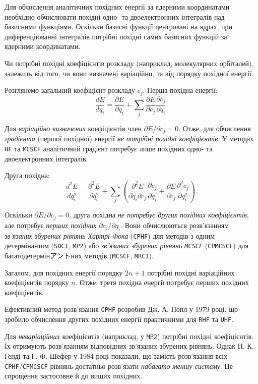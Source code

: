 \documentclass{PySCFBook}
\begin{document}
Для обчислення аналітичних похідних енергії за ядерними координатами необхідно обчислювати похідні одно- та двоелектронних інтегралів над базисними функціями. Оскільки базисні функції центровані на ядрах, при диференціюванні інтегралів потрібні похідні самих базисних функцій за ядерними координатами.

Чи потрібні похідні коефіцієнтів розкладу (наприклад, молекулярних орбіталей), залежить від того, чи вони визначені варіаційно, та від порядку похідної енергії.

Розглянемо загальний коефіцієнт розкладу $c_j$. Перша похідна енергії:
\begin{equation*}
\frac{dE}{dq_i}
= \frac{\partial E}{\partial q_i}
+ \sum_j \frac{\partial E}{\partial c_j} \frac{\partial c_j}{\partial q_i}.
\end{equation*}

Для \emph{варіаційно визначених} коефіцієнтів член $\partial E / \partial c_j = 0$. Отже, для обчислення \emph{градієнта} (першої похідної) енергії \emph{не потрібні похідні коефіцієнтів}. У методах \texttt{HF} та \texttt{MCSCF} аналітичний градієнт потребує лише похідних одно- та двоелектронних інтегралів.

Друга похідна:
\begin{equation*}
\frac{d^2E}{dq_i^2}
= \frac{\partial^2 E}{\partial q_i^2}
+ \sum_j \left(
  \frac{\partial^2 E}{\partial q_i \partial c_j} \frac{\partial c_j}{\partial q_i}
  + \frac{\partial E}{\partial c_j} \frac{\partial^2 c_j}{\partial q_i^2}
\right).
\end{equation*}

Оскільки $\partial E / \partial c_j = 0$, друга похідна \emph{не потребує других похідних коефіцієнтів}, але потребує \emph{перших похідних} $\partial c_j / \partial q_i$. Вони обчислюються розв’язанням \emph{зв’язаних збурених рівнянь Хартрі-Фока} (\texttt{CPHF}) для методів з одним детермінантом (\texttt{SDCI}, \texttt{MP2}) або \emph{зв’язаних збурених рівнянь \texttt{MCSCF}} (\texttt{CPMCSCF}) для багатодетермінアントних методів (\texttt{MCSCF}, \texttt{MRCI}).

Загалом, для похідних енергії порядку $2n+1$ потрібні похідні варіаційних коефіцієнтів порядку $n$. Отже, третя похідна енергії потребує перших похідних коефіцієнтів.

Ефективний метод розв’язання \texttt{CPHF} розробив Дж. А. Попл у 1979 році, що зробило обчислення других похідних енергії практичними для \texttt{RHF} та \texttt{UHF}.

Для \emph{неваріаційних} коефіцієнтів (наприклад, у \texttt{MP2}) потрібні похідні коефіцієнтів. Їх отримують розв’язанням відповідних зв’язаних збурених рівнянь. Однак Н. К. Генді та Г. Ф. Шефер у 1984 році показали, що замість розв’язання всіх \texttt{CPHF}/\texttt{CPMCSCF} рівнянь достатньо розв’язати \emph{набагато меншу систему}. Це спрощення застосовне й до вищих похідних.
\end{document}
